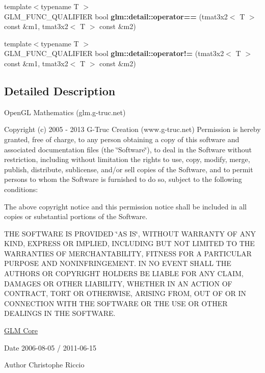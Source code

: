 \begin{DoxyCompactItemize}
\item 
\hypertarget{namespaceglm_1_1detail_a711bd8cb73c40bf9f6036f13a8d8201d}{}{\footnotesize template$<$typename T $>$ }\\G\+L\+M\+\_\+\+F\+U\+N\+C\+\_\+\+Q\+U\+A\+L\+I\+F\+I\+E\+R bool {\bfseries glm\+::detail\+::operator==} (tmat3x2$<$ T $>$ const \&m1, tmat3x2$<$ T $>$ const \&m2)\label{namespaceglm_1_1detail_a711bd8cb73c40bf9f6036f13a8d8201d}

\item 
\hypertarget{namespaceglm_1_1detail_a186f05d94039d3ce63c15a4426294ea2}{}{\footnotesize template$<$typename T $>$ }\\G\+L\+M\+\_\+\+F\+U\+N\+C\+\_\+\+Q\+U\+A\+L\+I\+F\+I\+E\+R bool {\bfseries glm\+::detail\+::operator!=} (tmat3x2$<$ T $>$ const \&m1, tmat3x2$<$ T $>$ const \&m2)\label{namespaceglm_1_1detail_a186f05d94039d3ce63c15a4426294ea2}

\end{DoxyCompactItemize}


\subsection{Detailed Description}
Open\+G\+L Mathematics (glm.\+g-\/truc.\+net)

Copyright (c) 2005 -\/ 2013 G-\/\+Truc Creation (www.\+g-\/truc.\+net) Permission is hereby granted, free of charge, to any person obtaining a copy of this software and associated documentation files (the \char`\"{}\+Software\char`\"{}), to deal in the Software without restriction, including without limitation the rights to use, copy, modify, merge, publish, distribute, sublicense, and/or sell copies of the Software, and to permit persons to whom the Software is furnished to do so, subject to the following conditions\+:

The above copyright notice and this permission notice shall be included in all copies or substantial portions of the Software.

T\+H\+E S\+O\+F\+T\+W\+A\+R\+E I\+S P\+R\+O\+V\+I\+D\+E\+D \char`\"{}\+A\+S I\+S\char`\"{}, W\+I\+T\+H\+O\+U\+T W\+A\+R\+R\+A\+N\+T\+Y O\+F A\+N\+Y K\+I\+N\+D, E\+X\+P\+R\+E\+S\+S O\+R I\+M\+P\+L\+I\+E\+D, I\+N\+C\+L\+U\+D\+I\+N\+G B\+U\+T N\+O\+T L\+I\+M\+I\+T\+E\+D T\+O T\+H\+E W\+A\+R\+R\+A\+N\+T\+I\+E\+S O\+F M\+E\+R\+C\+H\+A\+N\+T\+A\+B\+I\+L\+I\+T\+Y, F\+I\+T\+N\+E\+S\+S F\+O\+R A P\+A\+R\+T\+I\+C\+U\+L\+A\+R P\+U\+R\+P\+O\+S\+E A\+N\+D N\+O\+N\+I\+N\+F\+R\+I\+N\+G\+E\+M\+E\+N\+T. I\+N N\+O E\+V\+E\+N\+T S\+H\+A\+L\+L T\+H\+E A\+U\+T\+H\+O\+R\+S O\+R C\+O\+P\+Y\+R\+I\+G\+H\+T H\+O\+L\+D\+E\+R\+S B\+E L\+I\+A\+B\+L\+E F\+O\+R A\+N\+Y C\+L\+A\+I\+M, D\+A\+M\+A\+G\+E\+S O\+R O\+T\+H\+E\+R L\+I\+A\+B\+I\+L\+I\+T\+Y, W\+H\+E\+T\+H\+E\+R I\+N A\+N A\+C\+T\+I\+O\+N O\+F C\+O\+N\+T\+R\+A\+C\+T, T\+O\+R\+T O\+R O\+T\+H\+E\+R\+W\+I\+S\+E, A\+R\+I\+S\+I\+N\+G F\+R\+O\+M, O\+U\+T O\+F O\+R I\+N C\+O\+N\+N\+E\+C\+T\+I\+O\+N W\+I\+T\+H T\+H\+E S\+O\+F\+T\+W\+A\+R\+E O\+R T\+H\+E U\+S\+E O\+R O\+T\+H\+E\+R D\+E\+A\+L\+I\+N\+G\+S I\+N T\+H\+E S\+O\+F\+T\+W\+A\+R\+E.

\hyperlink{group__core}{G\+L\+M Core}

\begin{DoxyDate}{Date}
2006-\/08-\/05 / 2011-\/06-\/15 
\end{DoxyDate}
\begin{DoxyAuthor}{Author}
Christophe Riccio 
\end{DoxyAuthor}

